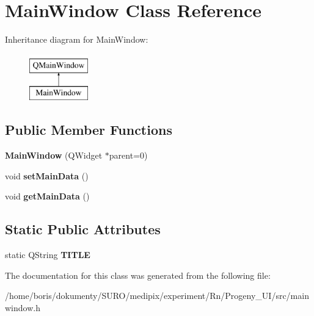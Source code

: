 \hypertarget{classMainWindow}{\section{Main\-Window Class Reference}
\label{classMainWindow}
}
Inheritance diagram for Main\-Window\-:\begin{figure}[H]
\begin{center}
\leavevmode
\includegraphics[height=2.000000cm]{classMainWindow}
\end{center}
\end{figure}
\subsection*{Public Member Functions}
\begin{DoxyCompactItemize}
\item 
\hypertarget{classMainWindow_a8b244be8b7b7db1b08de2a2acb9409db}{{\bfseries Main\-Window} (Q\-Widget $\ast$parent=0)}\label{classMainWindow_a8b244be8b7b7db1b08de2a2acb9409db}

\item 
\hypertarget{classMainWindow_a597a4a602b7ebad94f2eec86a0db7563}{void {\bfseries set\-Main\-Data} ()}\label{classMainWindow_a597a4a602b7ebad94f2eec86a0db7563}

\item 
\hypertarget{classMainWindow_a75ce441f08138eca2ef1665a66870a43}{void {\bfseries get\-Main\-Data} ()}\label{classMainWindow_a75ce441f08138eca2ef1665a66870a43}

\end{DoxyCompactItemize}
\subsection*{Static Public Attributes}
\begin{DoxyCompactItemize}
\item 
\hypertarget{classMainWindow_aa26df84f6e0c27464332427cec49d8a9}{static Q\-String {\bfseries T\-I\-T\-L\-E}}\label{classMainWindow_aa26df84f6e0c27464332427cec49d8a9}

\end{DoxyCompactItemize}


The documentation for this class was generated from the following file\-:\begin{DoxyCompactItemize}
\item 
/home/boris/dokumenty/\-S\-U\-R\-O/medipix/experiment/\-Rn/\-Progeny\-\_\-\-U\-I/src/mainwindow.\-h\end{DoxyCompactItemize}
